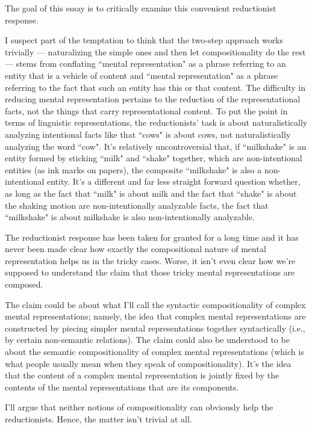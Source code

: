 \documentclass[a4paper,12pt]{article}
\begin{document}
The goal of this essay is to critically examine this convenient reductionist response.

I suspect part of the temptation to think that the two-step approach works trivially --- naturalizing the simple ones and then let compositionality do the rest --- stems from conflating ``mental representation" as a phrase referring to an entity that is a vehicle of content and ``mental representation" as a phrase referring to the fact that such an entity has this or that content. The difficulty in reducing mental representation pertains to the reduction of the representational facts, not the things that carry representational content. To put the point in terms of linguistic representations, the reductionists' task is about naturalistically analyzing intentional facts like that ``cows" is about cows, not naturalistically analyzing the word ``cow". It's relatively uncontroversial that, if ``milkshake" is an entity formed by sticking ``milk" and ``shake" together, which are non-intentional entities (as ink marks on papers), the composite ``milkshake" is also a non-intentional entity. It's a different and far less straight forward question whether, as long as the fact that ``milk" is about milk and the fact that ``shake" is about the shaking motion are non-intentionally analyzable facts, the fact that ``milkshake" is about milkshake is also non-intentionally analyzable.

The reductionist response has been taken for granted for a long time and it has never been made clear how exactly the compositional nature of mental representation helps us in the tricky cases. Worse, it isn't even clear how we're supposed to understand the claim that those tricky mental representations are composed.

The claim could be about what I'll call the syntactic compositionality of complex mental representations; namely, the idea that complex mental representations are constructed by piecing simpler mental representations together syntactically (i.e., by certain non-semantic relations). The claim could also be understood to be about the semantic compositionality of complex mental representations (which is what people usually mean when they speak of compositionality). It's the idea that the content of a complex mental representation is jointly fixed by the contents of the mental representations that are its components.

I'll argue that neither notions of compositionality can obviously help the reductionists. Hence, the matter isn't trivial at all.
\end{document}

